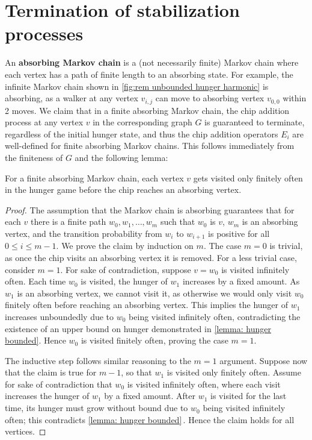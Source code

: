\section{Termination of stabilization processes}\label{section: termination}
An \textbf{absorbing Markov chain} is a (not necessarily finite) Markov chain 
where each vertex has a path of finite length to an absorbing state.
For example, the infinite Markov chain 
shown in \cref{fig:rem unbounded hunger harmonic}
is absorbing, as a walker at any vertex $v_{i,j}$ can move 
to absorbing vertex $v_{0,0}$ within 2 moves.
We claim that in a finite absorbing Markov chain, 
the chip addition process at any vertex $v$ in the corresponding graph $G$ 
is guaranteed to terminate, regardless of the initial hunger state, 
and thus the chip addition operators $E_i$ are well-defined
for finite absorbing Markov chains.
This follows immediately
from the finiteness of $G$ and the following lemma:

\begin{lemma}\label{lemma: finite terminate}
For a finite absorbing Markov chain, each vertex $v$ gets visited
only finitely often in the hunger game
before the chip reaches an absorbing vertex.
\end{lemma}

\begin{proof}
The assumption that the Markov chain is absorbing
guarantees that for each $v$
there is a finite path $w_0,w_1,\dots,w_m$ 
such that $w_0$ is $v$, $w_m$ is an absorbing vertex,
and the transition probability from $w_i$ to $w_{i+1}$
is positive for all $0 \leq i \leq m-1$.
We prove the claim by induction on $m$.
The case $m=0$ is trivial,
as once the chip visits an absorbing vertex it is removed.
For a less trivial case, consider $m=1$.
For sake of contradiction, suppose $v=w_0$ is visited infinitely often.
Each time $w_0$ is visited, the hunger of $w_1$ increases by a fixed amount.
As $w_1$ is an absorbing vertex, we cannot visit it, as otherwise we would only visit $w_0$ finitely often before reaching an absorbing vertex.
This implies the hunger of $w_1$ increases unboundedly due to $w_0$ being visited infinitely often, contradicting the existence of an upper bound on hunger demonstrated in \cref{lemma: hunger bounded}.
Hence $w_0$ is visited finitely often, proving the case $m=1$.

The inductive step follows similar reasoning to the $m=1$ argument.
Suppose now that the claim is true for $m-1$,
so that $w_1$ is visited only finitely often.
Assume for sake of contradiction that $w_0$ is visited infinitely often, 
where each visit increases the hunger of $w_1$ by a fixed amount.
After $w_1$ is visited for the last time,
its hunger must grow without bound due to $w_0$
being visited infinitely often;
this contradicts \cref{lemma: hunger bounded}\,.
Hence the claim holds for all vertices.
\end{proof}


